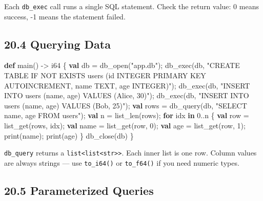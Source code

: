 \documentclass[
  english,
]{book}
\newenvironment{Shaded}{\begin{snugshade}}{\end{snugshade}}
\newcommand{\ControlFlowTok}[1]{\textcolor[rgb]{0.77,0.53,0.75}{\textbf{#1}}}
\newcommand{\DataTypeTok}[1]{\textcolor[rgb]{0.31,0.79,0.69}{#1}}
\newcommand{\DecValTok}[1]{\textcolor[rgb]{0.71,0.81,0.66}{#1}}
\newcommand{\FunctionTok}[1]{\textcolor[rgb]{0.86,0.86,0.67}{#1}}
\newcommand{\KeywordTok}[1]{\textcolor[rgb]{0.34,0.61,0.84}{\textbf{#1}}}
\newcommand{\NormalTok}[1]{\textcolor[rgb]{0.83,0.83,0.83}{#1}}
\newcommand{\OperatorTok}[1]{\textcolor[rgb]{0.83,0.83,0.83}{#1}}
\newcommand{\StringTok}[1]{\textcolor[rgb]{0.81,0.57,0.47}{#1}}
\begin{document}
Each \texttt{db\_exec} call runs a single SQL statement. Check the
return value: 0 means success, -1 means the statement failed.

\subsection{20.4 Querying Data}\label{querying-data}

\begin{Shaded}
\begin{Highlighting}[]
\KeywordTok{def}\NormalTok{ main() }\OperatorTok{{-}\textgreater{}} \DataTypeTok{i64}\NormalTok{ \{}
    \KeywordTok{val}\NormalTok{ db }\OperatorTok{=}\NormalTok{ db\_open(}\StringTok{"app.db"}\NormalTok{);}
\NormalTok{    db\_exec(db, }\StringTok{"CREATE TABLE IF NOT EXISTS users (id INTEGER PRIMARY KEY AUTOINCREMENT, name TEXT, age INTEGER)"}\NormalTok{);}
\NormalTok{    db\_exec(db, }\StringTok{"INSERT INTO users (name, age) VALUES (\textquotesingle{}Alice\textquotesingle{}, 30)"}\NormalTok{);}
\NormalTok{    db\_exec(db, }\StringTok{"INSERT INTO users (name, age) VALUES (\textquotesingle{}Bob\textquotesingle{}, 25)"}\NormalTok{);}
    \KeywordTok{val}\NormalTok{ rows }\OperatorTok{=}\NormalTok{ db\_query(db, }\StringTok{"SELECT name, age FROM users"}\NormalTok{);}
    \KeywordTok{val}\NormalTok{ n }\OperatorTok{=} \FunctionTok{list\_len}\NormalTok{(rows);}
    \ControlFlowTok{for}\NormalTok{ idx }\ControlFlowTok{in} \DecValTok{0}\OperatorTok{..}\NormalTok{n \{}
        \KeywordTok{val}\NormalTok{ row }\OperatorTok{=} \FunctionTok{list\_get}\NormalTok{(rows, idx);}
        \KeywordTok{val}\NormalTok{ name }\OperatorTok{=} \FunctionTok{list\_get}\NormalTok{(row, }\DecValTok{0}\NormalTok{);}
        \KeywordTok{val}\NormalTok{ age }\OperatorTok{=} \FunctionTok{list\_get}\NormalTok{(row, }\DecValTok{1}\NormalTok{);}
        \FunctionTok{print}\NormalTok{(name);}
        \FunctionTok{print}\NormalTok{(age)}
\NormalTok{    \}}
\NormalTok{    db\_close(db)}
\NormalTok{\}}
\end{Highlighting}
\end{Shaded}

\texttt{db\_query} returns a
\texttt{list\textless{}list\textless{}str\textgreater{}\textgreater{}}.
Each inner list is one row. Column values are always strings --- use
\texttt{to\_i64()} or \texttt{to\_f64()} if you need numeric types.

\subsection{20.5 Parameterized Queries}\label{parameterized-queries}
\end{document}
